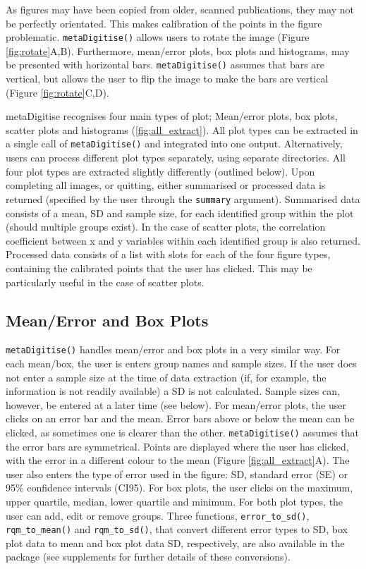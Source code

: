 \documentclass[12pt]{article}
\newcommand{\code}[1]{\texttt{#1}}
\newcommand{\fct}[1]{\texttt{#1()}}
\newcommand{\pkg}[1]{{\fontseries{b}\selectfont #1}}
\begin{document}
As figures may have been copied from older, scanned publications, they may not be perfectly orientated. This makes calibration of the points in the figure problematic. \fct{metaDigitise} allows users to rotate the image (Figure \ref{fig:rotate}A,B). Furthermore, mean/error plots, box plots and histograms, may be presented with horizontal bars. \fct{metaDigitise} assumes that bars are vertical, but allows the user to flip the image to make the bars are vertical (Figure \ref{fig:rotate}C,D).

\pkg{metaDigitise} recognises four main types of plot; Mean/error plots, box plots, scatter plots and histograms (\ref{fig:all_extract}). All plot types can be extracted in a single call of \fct{metaDigitise} and integrated into one output. Alternatively, users can process different plot types separately, using separate directories. All four plot types are extracted slightly differently (outlined below). Upon completing all images, or quitting, either summarised or processed data is returned (specified by the user through the \code{summary} argument). Summarised data consists of a mean, SD and sample size, for each identified group within the plot (should multiple groups exist). In the case of scatter plots, the correlation coefficient between x and y variables within each identified group is also returned. Processed data consists of a list with slots for each of the four figure types, containing the calibrated points that the user has clicked. This may be particularly useful in the case of scatter plots. 

\subsection{Mean/Error and Box Plots} 
\fct{metaDigitise} handles mean/error and box plots in a very similar way. For each mean/box, the user is enters group names and sample sizes. If the user does not enter a sample size at the time of data extraction (if, for example, the information is not readily available) a SD is not calculated. Sample sizes can, however, be entered at a later time (see below). For mean/error plots, the user clicks on an error bar and the mean. Error bars above or below the mean can be clicked, as sometimes one is clearer than the other. \fct{metaDigitise} assumes that the error bars are symmetrical. Points are displayed where the user has clicked, with the error in a different colour to the mean (Figure \ref{fig:all_extract}A). The user also enters the type of error used in the figure: SD, standard error (SE) or 95\% confidence intervals (CI95). For box plots, the user clicks on the maximum, upper quartile, median, lower quartile and minimum. For both plot types, the user can add, edit or remove groups. Three functions, \fct{error\_to\_sd}, \fct{rqm\_to\_mean} and \fct{rqm\_to\_sd}, that convert different error types to SD, box plot data to mean and box plot data SD, respectively, are also available in the package (see supplements for further details of these conversions).
\end{document}
